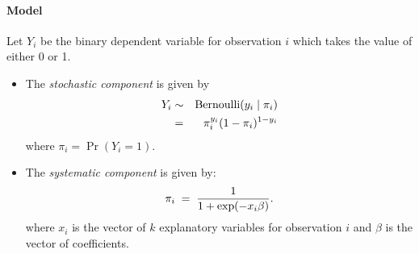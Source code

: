 \documentclass[letterpaper,10pt,english]{sphinxmanual}
\begin{document}
\paragraph{Model}
\label{zelig-logit:model}
Let \(Y_i\) be the binary dependent variable for observation
\(i\) which takes the value of either 0 or 1.
\begin{itemize}
\item {} 
The \emph{stochastic component} is given by
\begin{gather}
\begin{split}\begin{aligned}
Y_i &\sim& \textrm{Bernoulli}(y_i \mid \pi_i) \\
    &=& \pi_i^{y_i} (1-\pi_i)^{1-y_i}\end{aligned}\end{split}\notag
\end{gather}
where \(\pi_i=\Pr(Y_i=1)\).

\item {} 
The \emph{systematic component} is given by:
\begin{gather}
\begin{split}\pi_i \; = \; \frac{1}{1 + \exp(-x_i \beta)}.\end{split}\notag
\end{gather}
where \(x_i\) is the vector of \(k\) explanatory variables
for observation \(i\) and \(\beta\) is the vector of
coefficients.

\end{itemize}
\end{document}
